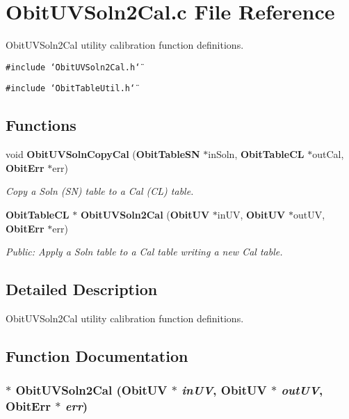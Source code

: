 \section{Obit\-UVSoln2Cal.c File Reference}
\label{ObitUVSoln2Cal_8c}
Obit\-UVSoln2Cal utility calibration function definitions. 

{\tt \#include \char`\"{}Obit\-UVSoln2Cal.h\char`\"{}}\par
{\tt \#include \char`\"{}Obit\-Table\-Util.h\char`\"{}}\par
\subsection*{Functions}
\begin{CompactItemize}
\item 
void {\bf Obit\-UVSoln\-Copy\-Cal} ({\bf Obit\-Table\-SN} $\ast$in\-Soln, {\bf Obit\-Table\-CL} $\ast$out\-Cal, {\bf Obit\-Err} $\ast$err)
\begin{CompactList}\small\item\em Copy a Soln (SN) table to a Cal (CL) table. \item\end{CompactList}\item 
{\bf Obit\-Table\-CL} $\ast$ {\bf Obit\-UVSoln2Cal} ({\bf Obit\-UV} $\ast$in\-UV, {\bf Obit\-UV} $\ast$out\-UV, {\bf Obit\-Err} $\ast$err)
\begin{CompactList}\small\item\em Public: Apply a Soln table to a Cal table writing a new Cal table. \item\end{CompactList}\end{CompactItemize}


\subsection{Detailed Description}
Obit\-UVSoln2Cal utility calibration function definitions. 



\subsection{Function Documentation}
\subsubsection{$\ast$ Obit\-UVSoln2Cal ({\bf Obit\-UV} $\ast$ {\em in\-UV}, {\bf Obit\-UV} $\ast$ {\em out\-UV}, {\bf Obit\-Err} $\ast$ {\em err})}\label{ObitUVSoln2Cal_8c_a1}


